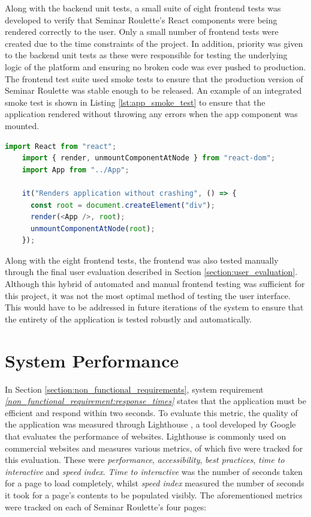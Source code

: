 \documentclass{l4proj}
\begin{document}
Along with the backend unit tests, a small suite of eight frontend tests was developed to verify that Seminar Roulette's React components were being rendered correctly to the user. Only a small number of frontend tests were created due to the time constraints of the project. In addition, priority was given to the backend unit tests as these were responsible for testing the underlying logic of the platform and ensuring no broken code was ever pushed to production. The frontend test suite used smoke tests to ensure that the production version of Seminar Roulette was stable enough to be released. An example of an integrated smoke test is shown in Listing \ref{lst:app_smoke_test} to ensure that the application rendered without throwing any errors when the app component was mounted. 

\begin{lstlisting}[language=JavaScript, caption={Frontend smoke test verifying that the app component rendered without crashing or throwing any errors.}, label=lst:app_smoke_test]
    import React from "react";
    import { render, unmountComponentAtNode } from "react-dom";
    import App from "../App";
    
    it("Renders application without crashing", () => {
      const root = document.createElement("div");
      render(<App />, root);
      unmountComponentAtNode(root);
    });
\end{lstlisting}

Along with the eight frontend tests, the frontend was also tested manually through the final user evaluation described in Section \ref{section:user_evaluation}. Although this hybrid of automated and manual frontend testing was sufficient for this project, it was not the most optimal method of testing the user interface. This would have to be addressed in future iterations of the system to ensure that the entirety of the application is tested robustly and automatically.

\section{System Performance}
\label{section:system_performance}

In Section \ref{section:non_functional_requirements}, system requirement \emph{\ref{non_functional_requirement:response_times}} states that the application must be efficient and respond within two seconds. To evaluate this metric, the quality of the application was measured through Lighthouse \citep{lighthouse}, a tool developed by Google that evaluates the performance of websites. Lighthouse is commonly used on commercial websites and measures various metrics, of which five were tracked for this evaluation. These were \emph{performance}, \emph{accessibility}, \emph{best practices}, \emph{time to interactive} and \emph{speed index}. \emph{Time to interactive} was the number of seconds taken for a page to load completely, whilst \emph{speed index} measured the number of seconds it took for a page's contents to be populated visibly. The aforementioned metrics were tracked on each of Seminar Roulette's four pages:
\end{document}
